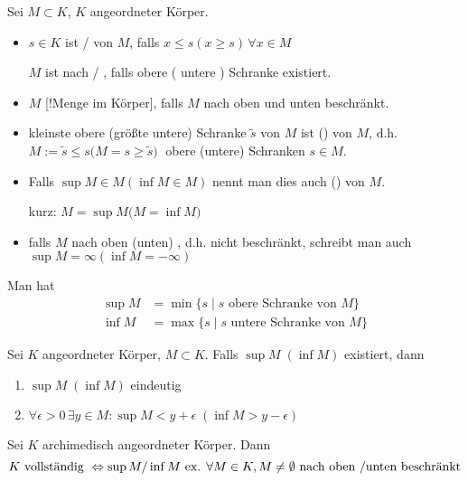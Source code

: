 \begin{*definition}
	Sei $M\subset K$, $K$ angeordneter Körper.
	\begin{itemize}
		\item $s\in K$ ist  /   von $M$, falls $x \le s (x \ge s)\,\forall x\in M$
		
		$M$ ist nach  /  , falls obere ( untere ) Schranke existiert.
		\item $M$ [!Menge im Körper], falls $M$ nach oben und unten beschränkt.
		\item kleinste obere (größte untere) Schranke $\tilde{s}$ von $M$ ist  () von $M$, d.h. \\
		$ M:= \tilde{s} \le s ($$ M = s \ge \tilde{s}) \;$ obere (untere) Schranken $s\in M$.
		\item Falls $\sup M \in M (\inf M\in M)$ nennt man dies auch  () von $M$.
		
		kurz: $M = \sup M ($$M = \inf M)$
		\item falls $M$ nach oben (unten) , d.h. nicht beschränkt, schreibt man auch $\sup M = \infty (\inf M = -\infty)$
	\end{itemize}

	Man hat
	\begin{align*}
	\sup M &= \min\{s \mid s \text{ obere Schranke von } M\}\\
	\inf M &= \max\{s \mid s \text{ untere Schranke von } M\}
	\end{align*}
\end{*definition}
\begin{proposition}
	Sei $K$ angeordneter Körper, $M\subset K$. Falls $\sup M\;(\inf M)$ existiert, dann
	\begin{enumerate}[label={\arabic*)}]
		\item $\sup M\;(\inf M)$ eindeutig
		\item $\forall \epsilon > 0\,\exists y\in M: \sup M < y + \epsilon\;(\inf M > y - \epsilon)$
	\end{enumerate}
\end{proposition}

\begin{theorem}
	Sei $K$ archimedisch angeordneter Körper. Dann
	\[ K \text{ vollständig } \Leftrightarrow \sup M \slash \inf M \text{ ex. }\forall M\in K, M\neq \emptyset \text{ nach oben \slash unten beschränkt} \]
\end{theorem}

